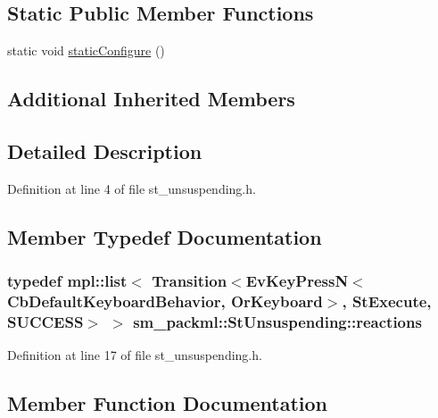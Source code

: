 \subsection*{Static Public Member Functions}
\begin{DoxyCompactItemize}
\item 
static void \hyperlink{structsm__packml_1_1StUnsuspending_a43b80d56cb694840d8ef946f11b91edb}{static\+Configure} ()
\end{DoxyCompactItemize}
\subsection*{Additional Inherited Members}


\subsection{Detailed Description}


Definition at line 4 of file st\+\_\+unsuspending.\+h.



\subsection{Member Typedef Documentation}
\subsubsection[{\texorpdfstring{reactions}{reactions}}]{\setlength{\rightskip}{0pt plus 5cm}typedef mpl\+::list$<$ Transition$<$Ev\+Key\+PressN$<$Cb\+Default\+Keyboard\+Behavior, {\bf Or\+Keyboard}$>$, {\bf St\+Execute}, {\bf S\+U\+C\+C\+E\+SS}$>$ $>$ {\bf sm\+\_\+packml\+::\+St\+Unsuspending\+::reactions}}\hypertarget{structsm__packml_1_1StUnsuspending_a3b12f7aa7f6d40e697bbc5b90e0f6f67}{}\label{structsm__packml_1_1StUnsuspending_a3b12f7aa7f6d40e697bbc5b90e0f6f67}


Definition at line 17 of file st\+\_\+unsuspending.\+h.



\subsection{Member Function Documentation}
